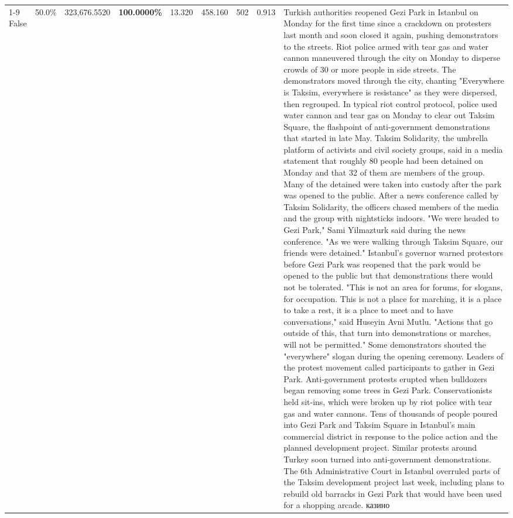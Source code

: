\begin{table}[H]
\begin{tabular}{lllrlllll}
\cline{1-9}
False & 50.0\% & 323,676.5520 & \bfseries \color{red} 100.0000\% & 13.320 & 458.160 & 502 & 0.913 & Turkish authorities reopened Gezi Park in Istanbul on Monday for the first time since a crackdown on protesters last month and soon closed it again, pushing demonstrators to the streets. Riot police armed with tear gas and water cannon maneuvered through the city on Monday to disperse crowds of 30 or more people in side streets. The demonstrators moved through the city, chanting "Everywhere is Taksim, everywhere is resistance" as they were dispersed, then regrouped. In typical riot control protocol, police used water cannon and tear gas on Monday to clear out Taksim Square, the flashpoint of anti-government demonstrations that started in late May. Taksim Solidarity, the umbrella platform of activists and civil society groups, said in a media statement that roughly 80 people had been detained on Monday and that 32 of them are members of the group. Many of the detained were taken into custody after the park was opened to the public. After a news conference called by Taksim Solidarity, the officers chased members of the media and the group with nightsticks indoors. "We were headed to Gezi Park," Sami Yilmazturk said during the news conference. "As we were walking through Taksim Square, our friends were detained." Istanbul's governor warned protestors before Gezi Park was reopened that the park would be opened to the public but that demonstrations there would not be tolerated. "This is not an area for forums, for slogans, for occupation. This is not a place for marching, it is a place to take a rest, it is a place to meet and to have conversations," said Huseyin Avni Mutlu. "Actions that go outside of this, that turn into demonstrations or marches, will not be permitted." Some demonstrators shouted the "everywhere" slogan during the opening ceremony. Leaders of the protest movement called participants to gather in Gezi Park. Anti-government protests erupted when bulldozers began removing some trees in Gezi Park. Conservationists held sit-ins, which were broken up by riot police with tear gas and water cannons. Tens of thousands of people poured into Gezi Park and Taksim Square in Istanbul's main commercial district in response to the police action and the planned development project. Similar protests around Turkey soon turned into anti-government demonstrations. The 6th Administrative Court in Istanbul overruled parts of the Taksim development project last week, including plans to rebuild old barracks in Gezi Park that would have been used for a shopping arcade. казино \\

\end{tabular}
\end{table}
